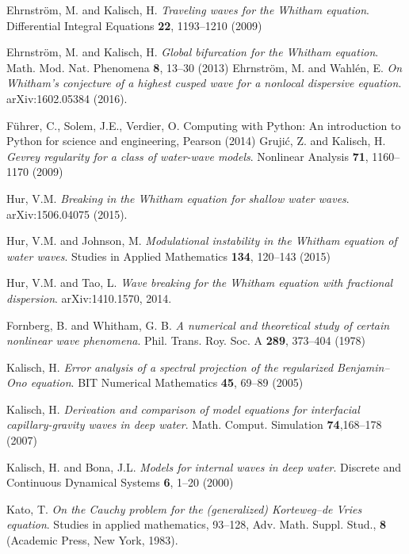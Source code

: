 \begin{thebibliography}{}
Ehrnstr{\"o}m, M. and Kalisch, H. 
{\em Traveling waves for the Whitham equation}. 
Differential Integral Equations \textbf{22}, 1193--1210 (2009)

Ehrnstr{\"o}m, M. and Kalisch, H. 
{\em Global bifurcation for the Whitham equation}.
Math. Mod. Nat. Phenomena \textbf{8}, 13--30 (2013)
%
Ehrnstr{\"o}m, M. and  Wahl\'en, E. 
{\em On Whitham's conjecture of a highest cusped wave for a nonlocal dispersive equation}. arXiv:1602.05384
(2016).

F\"uhrer, C., Solem, J.E., Verdier, O. 
Computing with Python: An introduction to Python for science and engineering, Pearson (2014)
%
 Gruji\'{c}, Z. and Kalisch, H.
{\em Gevrey regularity for a class of water-wave models}.
Nonlinear Analysis \textbf{71}, 1160--1170 (2009)

 Hur, V.M. 
{\em Breaking in the Whitham equation for shallow water waves}.
arXiv:1506.04075 (2015).


Hur, V.M. and Johnson, M. 
{\em Modulational instability in the Whitham equation of water waves}.
Studies in Applied Mathematics \textbf{134}, 120--143 (2015)


 Hur, V.M. and Tao, L.
{\em Wave breaking for the Whitham equation with fractional dispersion}.
arXiv:1410.1570, 2014.


Fornberg, B. and Whitham, G. B. 
{\em A numerical and theoretical study of certain nonlinear wave phenomena}. 
Phil. Trans. Roy. Soc. A \textbf{289}, 373--404 (1978)



Kalisch, H. 
{\em Error analysis of a spectral projection of the regularized Benjamin--Ono equation}.
BIT Numerical Mathematics \textbf{45}, 69--89 (2005)


Kalisch, H.
{\em Derivation and comparison of model equations for interfacial capillary-gravity waves in deep water}.
Math. Comput. Simulation \textbf{74},168--178 (2007)

Kalisch, H. and Bona, J.L.
{\em Models for internal waves in deep water}. 
Discrete and Continuous Dynamical Systems \textbf{6}, 1--20 (2000)

 Kato, T.
{\em On the Cauchy problem for the (generalized) Korteweg--de Vries equation}.
Studies in applied mathematics, 93--128, Adv. Math. Suppl. Stud., \textbf{8} 	
(Academic Press, New York, 1983).


\end{thebibliography}
